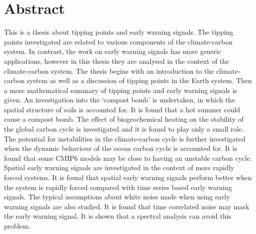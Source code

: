\chapter{Abstract}

This is a thesis about tipping points and early warning signals.
The tipping points investigated are related to various components of the climate-carbon system.
In contrast, the work on early warning signals has more generic applications, however in this thesis they are analysed in the context of the climate-carbon system.
The thesis begins with an introduction to the climate-carbon system as well as a discussion of tipping points in the
Earth system. Then a more mathematical summary of tipping points and early warning signals is given. An investigation into
the `compost bomb' is undertaken, in which the spatial structure of soils is accounted for. It is found that a hot summer could cause a compost bomb.
The effect of biogeochemical heating on the stability of the global carbon cycle is investigated and it is found to play only a small role.
The potential for instabilities in the climate-carbon cycle is further investigated when the dynamic behaviour of the ocean carbon cycle is accounted for. It is found
that some CMIP6 models may be close to having an unstable carbon cycle. Spatial early warning signals are investigated in the context of more rapidly forced
systems. It is found that spatial early warning signals perform better when the system is rapidly forced compared with time series based early warning signals.
The typical assumptions about white noise made when using early warning signals are also studied. It is found that time correlated noise may mask the
early warning signal. It is shown that a spectral analysis can avoid this problem.
